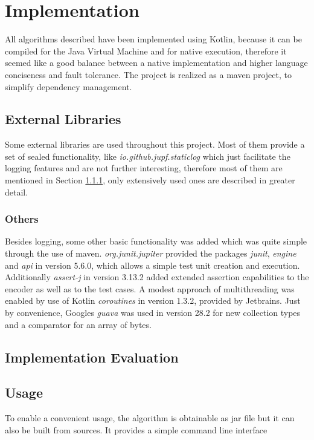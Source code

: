 \chapter{Implementation}
\label{ch:Implementation}
All algorithms described have been implemented using Kotlin, because it can be compiled for the Java Virtual Machine and for native execution, therefore it seemed like a good balance between a native implementation and higher language conciseness and fault tolerance. The project is realized as a maven project, to simplify dependency management. 


\section{External Libraries}
\label{ch:Implementation:sec:Impl:subsec:libs}
Some external libraries are used throughout this project. Most of them provide a set of sealed functionality, like \emph{io.github.jupf.staticlog} which just facilitate the logging features and are not further interesting, therefore most of them are mentioned in Section \ref{ch:Implementation:sec:Impl:subsec:libs:others}, only extensively used ones are described in greater detail. 


\subsection{Others}
\label{ch:Implementation:sec:Impl:subsec:libs:others}
Besides logging, some other basic functionality was added which was quite simple through the use of maven. \emph{org.junit.jupiter} provided the packages \emph{junit}, \emph{engine} and \emph{api} in version 5.6.0, which allows a simple test unit creation and execution. Additionally \emph{assert-j} in version 3.13.2 added extended assertion capabilities to the encoder as well as to the test cases. A modest approach of multithreading was enabled by use of Kotlin \emph{coroutines} in version 1.3.2, provided by Jetbrains. Just by convenience, Googles \emph{guava} was used in version 28.2 for new collection types and a comparator for an array of bytes.



\section{Implementation Evaluation}
\label{ch:Implementation:sec:Implementation Evaluation}


\section{Usage}
\label{ch:Implementation:sec:usage}
To enable a convenient usage, the algorithm is obtainable as jar file but it can also be built from sources. It provides a simple command line interface
